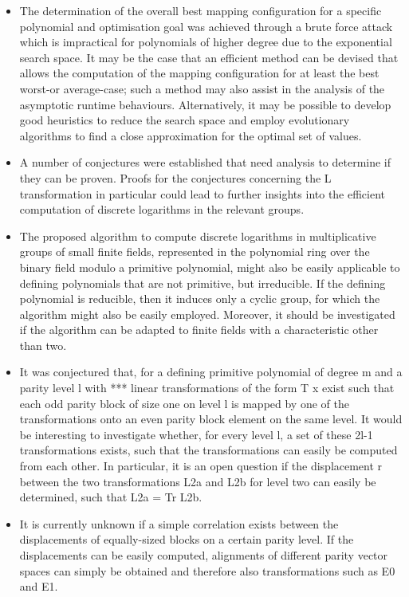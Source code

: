 \documentclass[a4paper, 11pt]{article}
\begin{document}
\begin{itemize}
\item The determination of the overall best mapping configuration for a specific polynomial and optimisation goal was achieved through a brute force attack which is impractical for polynomials of higher degree due to the exponential search space. It may be the case that an efficient method can be devised that allows the computation of the mapping configuration for at least the best worst-or average-case; such a method may also assist in the analysis of the asymptotic runtime behaviours. Alternatively, it may be possible to develop good heuristics to reduce the search space and employ evolutionary algorithms to find a close approximation for the optimal set of values.

\item A number of conjectures were established that need analysis to determine if they can be proven. Proofs for the conjectures concerning the L transformation in particular could lead to further insights into the efficient computation of discrete logarithms in the relevant groups.

\item The proposed algorithm to compute discrete logarithms in multiplicative groups of small finite fields, represented in the polynomial ring over the binary field modulo a primitive polynomial, might also be easily applicable to defining polynomials that are not primitive, but irreducible. If the defining polynomial is reducible, then it induces only a cyclic group, for which the algorithm might also be easily employed. Moreover, it should be investigated if the algorithm can be adapted to finite fields with a characteristic other than two.

\item It was conjectured that, for a defining primitive polynomial of degree m and a parity level l with *** linear transformations of the form T x exist such that each odd parity block of size one on level l is mapped by one of the transformations onto an even parity block element on the same level. It would be interesting to investigate whether, for every level l, a set of these 2l-1 transformations exists, such that the transformations can easily be computed from each other. In particular, it is an open question if the displacement r between the two transformations L2a and L2b for level two can easily be determined, such that L2a = Tr L2b.

\item It is currently unknown if a simple correlation exists between the displacements of equally-sized blocks on a certain parity level. If the displacements can be easily computed, alignments of different parity vector spaces can simply be obtained and therefore also transformations such as E0 and E1.
\end{itemize}
\end{document}
